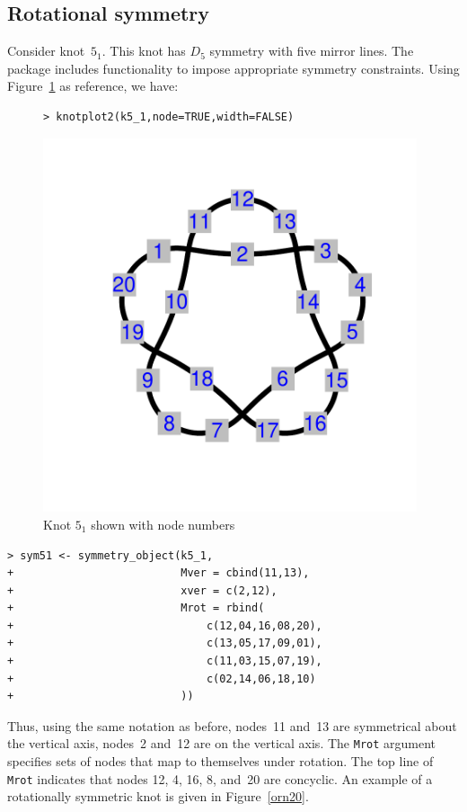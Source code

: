 \documentclass{birkjour}
\theoremstyle{definition}
\theoremstyle{remark}
\numberwithin{equation}{section}
\begin{document}
  
\subsection{Rotational symmetry}

Consider knot~$5_1$. This knot has $D_5$ symmetry with five mirror
lines.  The package includes functionality to impose appropriate
symmetry constraints. Using Figure~\ref{k5_1_twoknots} as reference,
we have:

\begin{figure}[htbp]
  \begin{center}
\begin{verbatim}
> knotplot2(k5_1,node=TRUE,width=FALSE)
\end{verbatim}
\includegraphics[width=11cm]{knot-k5_1}
\caption{Knot $5_1$ \label{k5_1_twoknots} shown with node numbers}
  \end{center}
\end{figure}

\begin{verbatim}
> sym51 <- symmetry_object(k5_1,
+                          Mver = cbind(11,13),
+                          xver = c(2,12),
+                          Mrot = rbind(
+                              c(12,04,16,08,20),
+                              c(13,05,17,09,01),
+                              c(11,03,15,07,19),
+                              c(02,14,06,18,10)
+                          ))
\end{verbatim}

Thus, using the same notation as before, nodes~11 and~13 are
symmetrical about the vertical axis, nodes~2 and~12 are on the
vertical axis.  The {\tt Mrot} argument specifies sets of nodes that
map to themselves under rotation.  The top line of {\tt Mrot}
indicates that nodes 12, 4, 16, 8, and~20 are concyclic.  An example
of a rotationally symmetric knot is given in Figure~\ref{orn20}.
\end{document}
